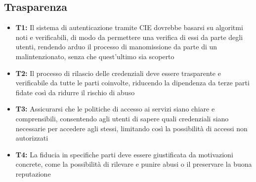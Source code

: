     \subsection{Trasparenza}
        \begin{itemize}
            \item \textbf{T1:} Il sistema di autenticazione tramite CIE dovrebbe basarsi su algoritmi noti e verificabili, di modo da permettere una verifica di essi da parte degli utenti, rendendo arduo il processo di manomissione da parte di un malintenzionato, senza che quest'ultimo sia scoperto  
        
            \item \textbf{T2:} Il processo di rilascio delle credenziali deve essere trasparente e verificabile da tutte le parti coinvolte, riducendo la dipendenza da terze parti fidate così da ridurre il rischio di abuso   
            
            \item \textbf{T3:} Assicurarsi che le politiche di accesso ai servizi siano chiare e comprensibili, consentendo agli utenti di sapere quali credenziali siano necessarie per accedere agli stessi, limitando così la possibilità di accessi non autorizzati

            \item \textbf{T4:} La fiducia in specifiche parti deve essere giustificata da motivazioni concrete, come la possibilità di rilevare e punire abusi o il preservare la buona reputazione
        \end{itemize}


